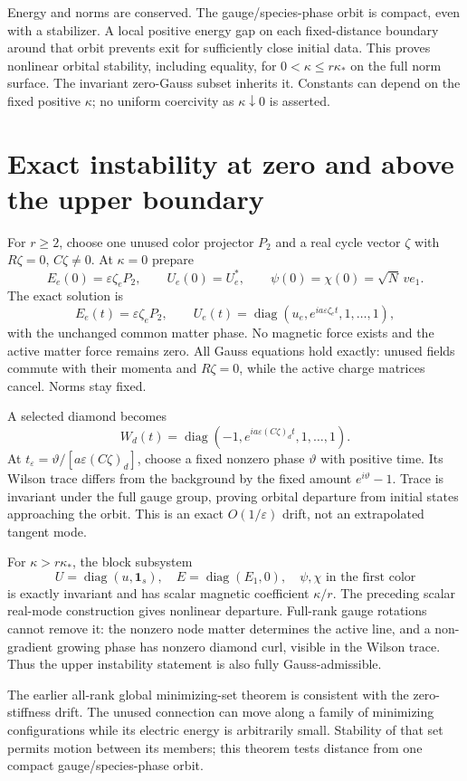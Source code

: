 \documentclass[11pt,a4paper]{article}
\newcommand{\id}{\mathbf1}\newcommand{\tr}{\operatorname{tr}}\newcommand{\diag}{\operatorname{diag}}\newcommand{\Rea}{\operatorname{Re}}
\begin{document}
Energy and norms are conserved. The gauge/species-phase orbit is compact, even with a stabilizer. A local positive energy gap on each fixed-distance boundary around that orbit prevents exit for sufficiently close initial data. This proves nonlinear orbital stability, including equality, for $0<\kappa\le r\kappa_*$ on the full norm surface. The invariant zero-Gauss subset inherits it. Constants can depend on the fixed positive $\kappa$; no uniform coercivity as $\kappa\downarrow0$ is asserted.

\newpage
\section{Exact instability at zero and above the upper boundary}
For $r\ge2$, choose one unused color projector $P_2$ and a real cycle vector $\zeta$ with $R\zeta=0$, $C\zeta\ne0$. At $\kappa=0$ prepare
\[
E_e(0)=\varepsilon\zeta_eP_2,\qquad U_e(0)=U_e^*,
\qquad\psi(0)=\chi(0)=\sqrt N\,v e_1.
\]
The exact solution is
\[
E_e(t)=\varepsilon\zeta_eP_2,\qquad
U_e(t)=\diag\left(u_e,e^{ia\varepsilon\zeta_et},1,\ldots,1\right),
\]
with the unchanged common matter phase. No magnetic force exists and the active matter force remains zero. All Gauss equations hold exactly: unused fields commute with their momenta and $R\zeta=0$, while the active charge matrices cancel. Norms stay fixed.

A selected diamond becomes
\[
W_d(t)=\diag\left(-1,e^{ia\varepsilon(C\zeta)_dt},1,\ldots,1\right).
\]
At $t_\varepsilon=\vartheta/[a\varepsilon(C\zeta)_d]$, choose a fixed nonzero phase $\vartheta$ with positive time. Its Wilson trace differs from the background by the fixed amount $e^{i\vartheta}-1$. Trace is invariant under the full gauge group, proving orbital departure from initial states approaching the orbit. This is an exact $O(1/\varepsilon)$ drift, not an extrapolated tangent mode.

For $\kappa>r\kappa_*$, the block subsystem
\[
U=\diag(u,\id_s),\quad E=\diag(E_1,0),\quad
\psi,\chi\text{ in the first color}
\]
is exactly invariant and has scalar magnetic coefficient $\kappa/r$. The preceding scalar real-mode construction gives nonlinear departure. Full-rank gauge rotations cannot remove it: the nonzero node matter determines the active line, and a non-gradient growing phase has nonzero diamond curl, visible in the Wilson trace. Thus the upper instability statement is also fully Gauss-admissible.

The earlier all-rank global minimizing-set theorem is consistent with the zero-stiffness drift. The unused connection can move along a family of minimizing configurations while its electric energy is arbitrarily small. Stability of that set permits motion between its members; this theorem tests distance from one compact gauge/species-phase orbit.
\end{document}

